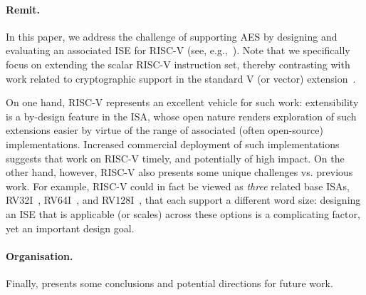 
\paragraph{Remit.}

In this paper, we address the challenge of supporting AES by designing and
evaluating an associated ISE for RISC-V
(see, e.g.,~\cite{riscv:1,riscv:2}).
Note that we specifically focus on extending the scalar RISC-V instruction 
set, thereby contrasting with work related to cryptographic support in the
standard V (or vector) extension~\cite[Section 21]{RV:ISA:I:19}.

On one hand, 
RISC-V represents an excellent vehicle for such work:
extensibility is a by-design feature in the ISA, whose open nature renders
exploration of such extensions easier by virtue of the range of associated 
(often open-source) implementations.  
Increased commercial deployment of such implementations suggests that work 
on RISC-V timely, and potentially of high impact.
On the other hand, however,
RISC-V also presents some unique challenges vs. previous work.
For example,
RISC-V could in fact be viewed as {\em three} related base ISAs,
 RV32I~\cite[Section 2]{RV:ISA:I:19},
 RV64I~\cite[Section 5]{RV:ISA:I:19},
and
RV128I~\cite[Section 6]{RV:ISA:I:19},
that each support a different word size:
designing an ISE that is applicable (or scales) across these options is a
complicating factor, yet an important design goal.



\paragraph{Organisation.}


Finally, 
presents some conclusions and potential directions for future work.

%


